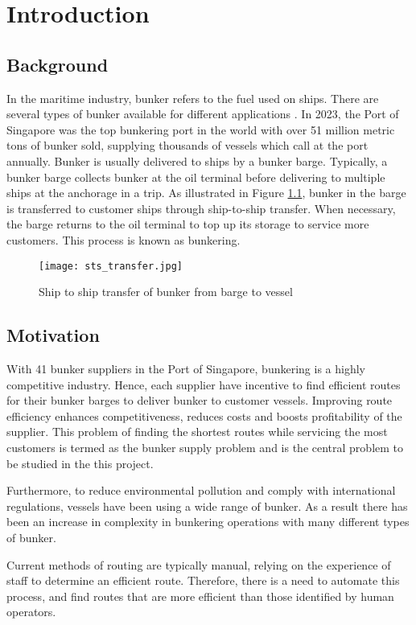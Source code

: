 \chapter{Introduction}

\section{Background}
In the maritime industry, bunker refers to the fuel used on ships. There are several types of bunker available for different applications \cite{noauthor_products_2024}. In 2023, the Port of Singapore was the top bunkering port in the world with over 51 million metric tons \cite{noauthor_cautious_2024} of bunker sold, supplying thousands of vessels which call at the port annually. Bunker is usually delivered to ships by a bunker barge. Typically, a bunker barge collects bunker at the oil terminal before delivering to multiple ships at the anchorage in a trip. As illustrated in Figure \ref{Fig:STS}, bunker in the barge is transferred to customer ships through ship-to-ship transfer. When necessary, the barge returns to the oil terminal to top up its storage to service more customers. This process is known as bunkering.

\begin{figure}
\texttt{[image: sts\_transfer.jpg]}
\caption{Ship to ship transfer of bunker from barge to vessel}
\label{Fig:STS}
\end{figure}

\section{Motivation}
With 41 bunker suppliers \cite{noauthor_list_2024} in the Port of Singapore, bunkering is a highly competitive industry. Hence, each supplier have incentive to find efficient routes for their bunker barges to deliver bunker to customer vessels. Improving route efficiency enhances competitiveness, reduces costs and boosts profitability of the supplier. This problem of finding the shortest routes while servicing the most customers is termed as the bunker supply problem and is the central problem to be studied in the this project. 

Furthermore, to reduce environmental pollution and comply with international regulations, vessels have been using a wide range of bunker. As a result there has been an increase in complexity in bunkering operations with many different types of bunker.

Current methods of routing are typically manual, relying on the experience of staff to determine an efficient route. Therefore, there is a need to automate this process, and find routes that are more efficient than those identified by human operators. 

